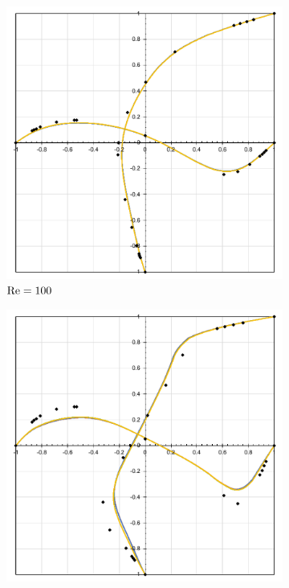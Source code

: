 \begin{figure}[h!]
    \centering
    \caption{Cavidade tridimensional - Valores do campo de velocidades sobre as linhas médias.}
    \begin{subfigure}{0.49\textwidth}
        \centering
        \includegraphics[width=\linewidth]{Figuras/cavity3D/Re100.pdf}
        \caption{$\mathrm{Re}=100$}
    \end{subfigure}
    \begin{subfigure}{0.49\textwidth}
        \centering
        \includegraphics[width=\linewidth]{Figuras/cavity3D/Re400.pdf}

\end{subfigure}
\end{figure}
